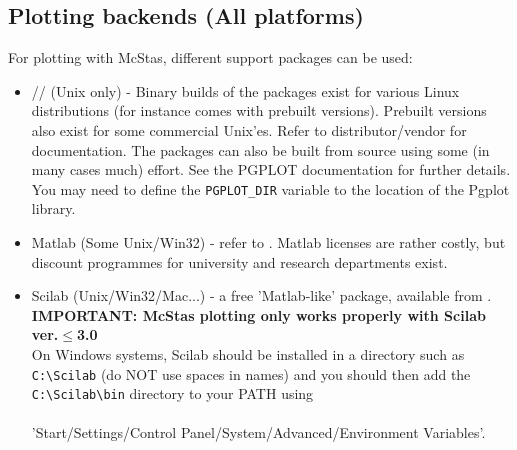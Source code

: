 \subsection{Plotting backends (All platforms)}
\label{s:plotting}
For plotting with McStas, different support packages can be used:
\begin{itemize}
\item{// (Unix only) - Binary builds of the packages
    exist for various Linux distributions (for instance
     comes with
    prebuilt versions). Prebuilt versions also exist for some commercial Unix'es.
    Refer to distributor/vendor for documentation. The packages can also be
    built from source using some (in many cases much) effort.  See the
    PGPLOT documentation for further details.
    You may need to define the \verb+PGPLOT_DIR+ variable to the location of the Pgplot library. }
\item{Matlab (Some Unix/Win32) - refer to
    . Matlab licenses are rather costly, but discount programmes for university and research departments exist.}
\item{Scilab (Unix/Win32/Mac...) - a free 'Matlab-like' package, available from
    .
    \\{\bf IMPORTANT: McStas plotting only works properly with Scilab
      ver.$\leq $3.0 }\\
On Windows systems, Scilab should be installed in a directory such as \verb+C:\Scilab+ (do NOT use spaces in names) and you should then add the \verb+C:\Scilab\bin+ directory to your PATH using\\\ \\
'Start/Settings/Control Panel/System/Advanced/Environment Variables'.}
\end{itemize}

